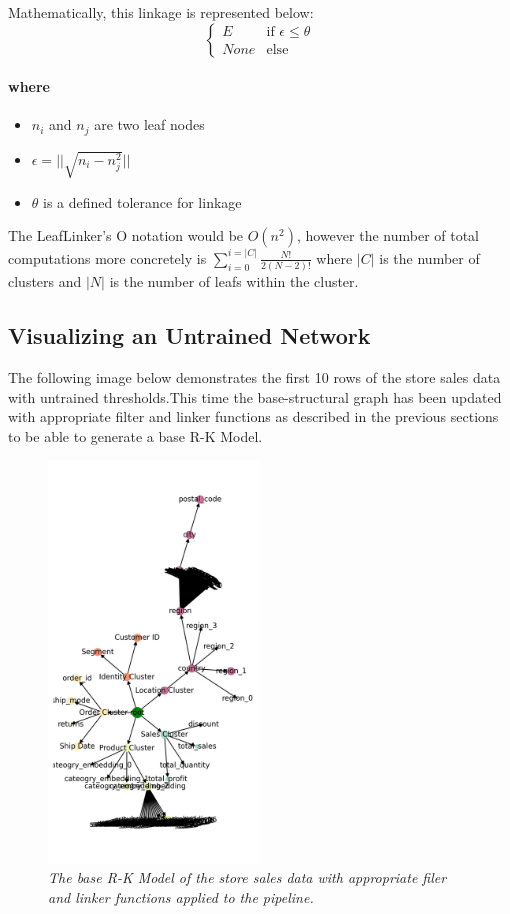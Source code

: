 Mathematically, this linkage is represented below:
\[
\begin{cases}
     E & \text{if } \epsilon \le \theta\\
     None & \text{else}
\end{cases}
\]


\paragraph{where}
\begin{itemize}
  \item{$n_{i}$ and $n_{j}$ are two leaf nodes }
  \item{$\epsilon = || \sqrt{n_{i}-n_{j}^{2}} ||$}
  \item{$\theta$ is a defined tolerance for linkage}
\end{itemize}

The LeafLinker's O notation would be $O(n^{2})$, however the number of total computations more concretely is $\sum_{i=0}^{i=|C|}\frac{N!}{2(N-2)!}$ where $|C|$ is the number of clusters and $|N|$ is the number of leafs within the cluster.

\subsection{Visualizing an Untrained Network}

The following image below demonstrates the first 10 rows of the store sales data with untrained thresholds.This time the base-structural graph has been updated with appropriate filter and linker functions as described in the previous sections to be able to generate a base R-K Model.

\begin{figure}[H]
	\centering
        \includegraphics[width=0.5\textwidth]{images/base_model.png}
	\caption{\textit{The base R-K Model of the store sales data with appropriate filer and linker functions applied to the pipeline.}}
	\label{fig:base_model}
\end{figure}

